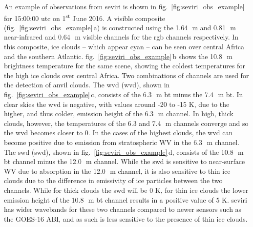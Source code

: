 An example of observations from \acrshort{seviri} is shown in fig.~\ref{fig:seviri_obs_example} for 15:00:00
\acrshort{utc} on 1\textsuperscript{st} June 2016. A visible composite (fig.~\ref{fig:seviri_obs_example}\,a) is
constructed using the 1.64\,\unit{\mu m} and 0.81\,\unit{\mu m} near-infrared and 0.64\,\unit{\mu m} visible
channels for the \acrshort{rgb} channels respectively. In this
composite, ice clouds -- which appear cyan -- can be seen over central
Africa and the southern Atlantic. fig.~\ref{fig:seviri_obs_example}\,b shows the 10.8\,\unit{\mu m} brightness
temperature for the same scene, showing the coldest temperatures for the
high ice clouds over central Africa. Two combinations of channels are
used for the detection of anvil clouds. The \acrshort{wvd}
(\acrshort{wvd}), shown in fig.~\ref{fig:seviri_obs_example}\,c, consists of the 6.3\,\unit{\mu m} \acrshort{bt}
minus the 7.4\,\unit{\mu m} \acrshort{bt}. In clear skies the \acrshort{wvd} is
negative, with values around -20 to -15 K, due to the higher, and thus
colder, emission height of the 6.3\,\unit{\mu m} channel. In high, thick clouds,
however, the temperatures of the 6.3 and 7.4\,\unit{\mu m} channels converge and so
the \acrshort{wvd} becomes closer to 0. In the cases of the highest clouds, the \acrshort{wvd}
can become positive due to emission from stratospheric WV in the 6.3\,\unit{\mu m}
channel. The \acrshort{swd} (\acrshort{swd}), shown in fig.~\ref{fig:seviri_obs_example}\,d, consists
of the 10.8\,\unit{\mu m} \acrshort{bt} channel minus the 12.0\,\unit{\mu m} channel. While the \acrshort{swd} is
sensitive to near-surface WV due to absorption in the 12.0\,\unit{\mu m} channel, it
is also sensitive to thin ice clouds due to the difference in emissivity
of ice particles between the two channels. While for thick clouds the
\acrshort{swd} will be 0 K, for thin ice clouds the lower emission height of the
10.8\,\unit{\mu m} \acrshort{bt} channel results in a positive value of 5 K. \acrshort{seviri} has wider
wavebands for these two channels compared to newer sensors such as the
GOES-16 ABI, and as such is less sensitive to the presence of thin ice
clouds.


